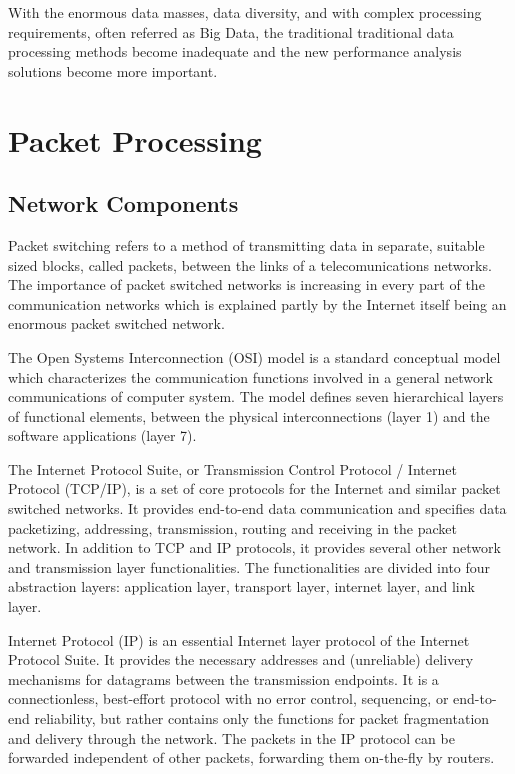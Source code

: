 With the enormous data masses, data diversity, and with complex processing requirements, often referred as Big Data, the traditional traditional data processing methods become inadequate and the new performance analysis solutions become more important.


\section{Packet Processing}
\label{sec:packet-processing}

\subsection{Network Components}
Packet switching refers to a method of transmitting data in separate, suitable sized blocks, called packets, between the links of a telecomunications networks. The importance of packet switched networks is increasing in every part of the communication networks which is explained partly by the Internet itself being an enormous packet switched network.

The Open Systems Interconnection (OSI) model is a standard conceptual model which characterizes the communication functions involved in a general network communications of computer system. The model defines seven hierarchical layers of functional elements, between the physical interconnections (layer 1) and the software applications (layer 7).~\cite{ISO:1994:OSI}

The Internet Protocol Suite, or Transmission Control Protocol / Internet Protocol (TCP/IP), is a set of core protocols for the Internet and similar packet switched networks. It provides end-to-end data communication and specifies data packetizing, addressing, transmission, routing and receiving in the packet network. In addition to TCP and IP protocols, it provides several other network and transmission layer functionalities. The functionalities are divided into four abstraction layers: application layer, transport layer, internet layer, and link layer.~\cite{Braden:1989:TCPIP}

Internet Protocol (IP) is an essential Internet layer protocol of the Internet Protocol Suite. It provides the necessary addresses and (unreliable) delivery mechanisms for datagrams between the transmission endpoints. It is a connectionless, best-effort protocol with no error control, sequencing, or end-to-end reliability, but rather contains only the functions for packet fragmentation and delivery through the network. The packets in the IP protocol can be forwarded independent of other packets, forwarding them on-the-fly by routers.~\cite{Deering:1998:Internet}

